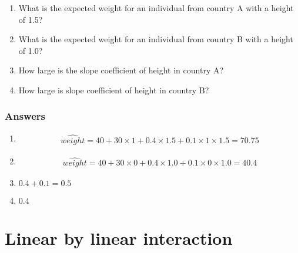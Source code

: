 \begin{enumerate}
\item What is the expected weight for an individual from country A with a height of 1.5?\\
\item What is the expected weight for an individual from country B with a height of 1.0?\\
\item How large is the slope coefficient of height in country A? \\
\item How large is slope coefficient of height in country B?\\
\end{enumerate}

\subsubsection{Answers}
\begin{enumerate}

\item 
\begin{eqnarray}
\widehat{weight}= 40 + 30 \times 1 + 0.4\times 1.5 + 0.1 \times 1\times 1.5 =70.75 \nonumber
\end{eqnarray}

\item
\begin{eqnarray}
\widehat{weight}= 40 + 30 \times 0 + 0.4\times 1.0 + 0.1 \times 0\times 1.0 =40.4\nonumber
\end{eqnarray}


\item{$0.4 + 0.1 = 0.5$}

\item{$0.4$}


\end{enumerate}


\section{Linear by linear interaction}


